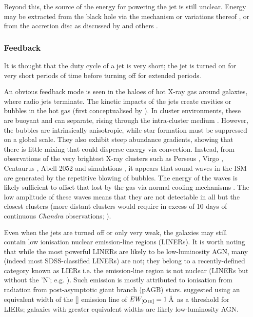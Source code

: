 			Beyond this, the source of the energy for powering the jet is still unclear. Energy may be extracted from the black hole via the \citet{Blandford1977} mechanism or variations thereof \citep[e.g.][]{Koide2002}, or from the accretion disc as discussed by \citet{Blandford1982} and others \citep[e.g.][]{Hujeirat2003}. 

		\subsubsection{Feedback}
			\label{subsubsec:JetFeedback}
			It is thought that the duty cycle of a jet is very short; the jet is turned on for very short periods of time before turning off for extended periods. 

			An obvious feedback mode is seen in the haloes of hot X-ray gas around galaxies, where radio jets terminate. The kinetic impacts of the jets create cavities or bubbles in the hot gas (first conceptualised by \citealt{Gull1973}). In cluster environments, these are buoyant and can separate, rising through the intra-cluster medium \citep[e.g.][]{Churazov2000, Churazov2001, McNamara2000}. However, the bubbles are intrinsically anisotropic, while star formation must be suppressed on a global scale. They also exhibit steep abundance gradients, showing that there is little mixing that could disperse energy via convection. Instead, from observations of the very brightest X-ray clusters such as Perseus \citep{Fabian2003, Fabian2006}, Virgo \citep{Forman2007}, Centaurus \citep{Sanders2008}, Abell 2052 \citep{Blanton2011} and simulations \citep[e.g.][]{Ruszkowski2004, Sijacki2006}, it appears that sound waves in the ISM are generated by the repetitive blowing of bubbles. The energy of the waves is likely sufficient to offset that lost by the gas via normal cooling mechanisms \citep{Fabian2003}. The low amplitude of these waves means that they are not detectable in all but the closest clusters (more distant clusters would require in excess of 10 days of continuous \textit{Chandra} observations; \citealt{Graham2008}).

			Even when the jets are turned off or only very weak, the galaxies may still contain low ionisation nuclear emission-line regions (LINERs). It is worth noting that while the most powerful LINERs are likely to be low-luminosity AGN, many (indeed most SDSS-classified LINERs) are not; they belong to a recently-defined category known as LIERs i.e. the emission-line region is not nuclear (LINERs but without the 'N'; e.g. \citealt{Sarzi2005, Sarzi2010, Singh2013, Belfiore2016a}). Such emission is mostly attributed to ionisation from radiation from post-asymptotic giant branch (pAGB) stars. \citet{Capetti2011} suggested using an equivalent width of the [] emission line of $EW_\text{[\ion{O}{iii}]} = 1$\,\AA\ as a threshold for LIERs; galaxies with greater equivalent widths are likely low-luminosity AGN.

